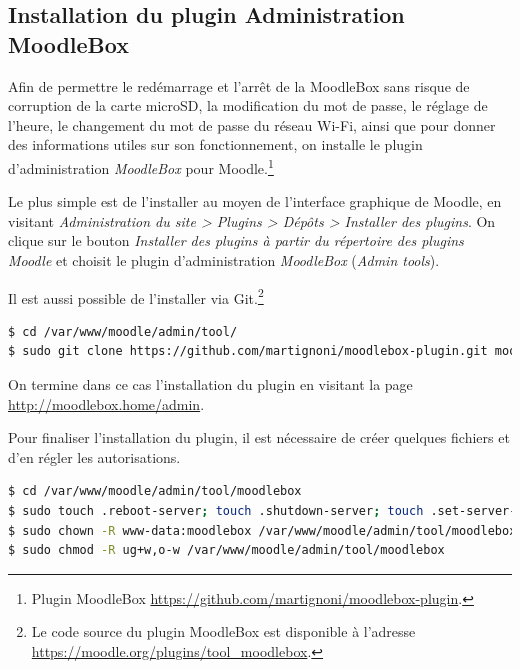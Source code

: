 \documentclass[12pt]{article}
\begin{document}

\subsection{Installation du plugin Administration MoodleBox}

Afin de permettre le redémarrage et l'arrêt de la MoodleBox sans risque de corruption de la carte microSD, la modification du mot de passe, le réglage de l'heure, le changement du mot de passe du réseau Wi-Fi, ainsi que pour donner des informations utiles sur son fonctionnement, on installe le plugin d'administration \emph{MoodleBox} pour Moodle.\footnote{Plugin MoodleBox \url{https://github.com/martignoni/moodlebox-plugin}.}

Le plus simple est de l'installer au moyen de l'interface graphique de Moodle, en visitant \emph{Administration du site > Plugins > Dépôts > Installer des plugins}.
On clique sur le bouton \emph{Installer des plugins à partir du répertoire des plugins Moodle} et choisit le plugin d'administration \emph{MoodleBox} (\emph{Admin tools}).

Il est aussi possible de l'installer via Git.\footnote{Le code source du plugin MoodleBox est disponible à l'adresse \url{https://moodle.org/plugins/tool_moodlebox}.}

\begin{lstlisting}[language=bash]
$ cd /var/www/moodle/admin/tool/
$ sudo git clone https://github.com/martignoni/moodlebox-plugin.git moodlebox
\end{lstlisting}

On termine dans ce cas l'installation du plugin en visitant la page \url{http://moodlebox.home/admin}.

Pour finaliser l'installation du plugin, il est nécessaire de créer quelques fichiers et d'en régler les autorisations.
\begin{lstlisting}[language=bash]
$ cd /var/www/moodle/admin/tool/moodlebox
$ sudo touch .reboot-server; touch .shutdown-server; touch .set-server-datetime; touch .newpassword; touch .wifisettings
$ sudo chown -R www-data:moodlebox /var/www/moodle/admin/tool/moodlebox
$ sudo chmod -R ug+w,o-w /var/www/moodle/admin/tool/moodlebox
\end{lstlisting}
\end{document}
